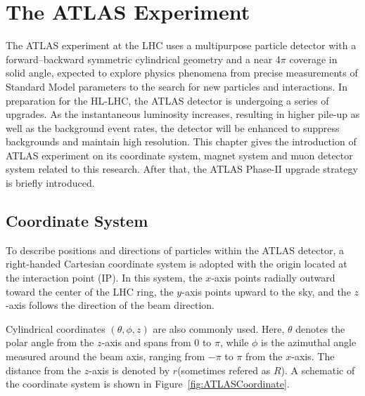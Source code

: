 \chapter{The ATLAS Experiment} \label{ch:ATLAS} 
The ATLAS experiment at the LHC uses a multipurpose particle detector with a forward–backward symmetric cylindrical geometry and a near 4$\pi$ coverage in solid angle, expected to explore physics phenomena from precise measurements of Standard Model parameters to the search for new particles and interactions. In preparation for the HL-LHC, the ATLAS detector is undergoing a series of upgrades. As the instantaneous luminosity increases, resulting in higher pile-up as well as the background event rates, the detector will be enhanced to suppress backgrounds and maintain high resolution. This chapter gives the introduction of ATLAS experiment on its coordinate system, magnet system and muon detector system related to this research. After that, the ATLAS Phase-II upgrade strategy is briefly introduced.
\section{Coordinate System} \label{sec:CoordinateSystem}
To describe positions and directions of particles within the ATLAS detector, a right-handed Cartesian coordinate system is adopted with the origin located at the interaction point (IP). In this system, the \(x\)-axis points radially outward toward the center of the LHC ring, the \(y\)-axis points upward to the sky, and the \(z\)-axis follows the direction of the beam direction. 

Cylindrical coordinates \((\theta, \phi, z)\) are also commonly used. Here, \(\theta\) denotes the polar angle from the \(z\)-axis and spans from \(0\) to \(\pi\), while \(\phi\) is the azimuthal angle measured around the beam axis, ranging from \(-\pi\) to \(\pi\) from the \(x\)-axis. The distance from the \(z\)-axis is denoted by \(r\)(sometimes refered as \(R\)). A schematic of the coordinate system is shown in Figure~\ref{fig:ATLASCoordinate}.


